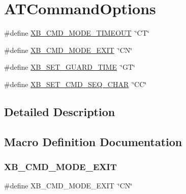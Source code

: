 \hypertarget{group___a_t_command_options}{}\section{A\+T\+Command\+Options}
\label{group___a_t_command_options}
\begin{DoxyCompactItemize}
\item 
\#define \mbox{\hyperlink{group___a_t_command_options_ga44b29b82d01677566af011179946866f}{X\+B\+\_\+\+C\+M\+D\+\_\+\+M\+O\+D\+E\+\_\+\+T\+I\+M\+E\+O\+UT}}~\char`\"{}CT\char`\"{}
\item 
\#define \mbox{\hyperlink{group___a_t_command_options_ga521bbb1db05244aa3171ddeacb3a528e}{X\+B\+\_\+\+C\+M\+D\+\_\+\+M\+O\+D\+E\+\_\+\+E\+X\+IT}}~\char`\"{}CN\char`\"{}
\item 
\#define \mbox{\hyperlink{group___a_t_command_options_ga87806745d2177177af3bc9da86cbdd2f}{X\+B\+\_\+\+S\+E\+T\+\_\+\+G\+U\+A\+R\+D\+\_\+\+T\+I\+ME}}~\char`\"{}GT\char`\"{}
\item 
\#define \mbox{\hyperlink{group___a_t_command_options_gaaa54d14d569183034d941ef1e82dc3e5}{X\+B\+\_\+\+S\+E\+T\+\_\+\+C\+M\+D\+\_\+\+S\+E\+Q\+\_\+\+C\+H\+AR}}~\char`\"{}CC\char`\"{}
\end{DoxyCompactItemize}


\subsection{Detailed Description}


\subsection{Macro Definition Documentation}
\mbox{\label{group___a_t_command_options_ga521bbb1db05244aa3171ddeacb3a528e}} 
\subsubsection{\texorpdfstring{X\+B\+\_\+\+C\+M\+D\+\_\+\+M\+O\+D\+E\+\_\+\+E\+X\+IT}{XB\_CMD\_MODE\_EXIT}}
{\footnotesize\ttfamily \#define X\+B\+\_\+\+C\+M\+D\+\_\+\+M\+O\+D\+E\+\_\+\+E\+X\+IT~\char`\"{}CN\char`\"{}}

